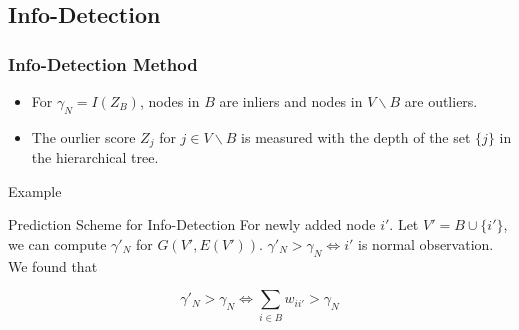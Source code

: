 \documentclass[notheorems]{beamer}
\begin{document}
\subsection{Info-Detection}
\begin{frame}
	\frametitle{Info-Detection Method}
\begin{itemize}
\item For $\gamma_N = I(Z_B)$, nodes in $B$ are inliers and nodes in $V\backslash B$ are outliers.
\item The ourlier score $Z_j$ for $j \in V\backslash B$ is measured with the depth of the set $\{j\}$ in the hierarchical tree.
\end{itemize}
Example
\end{frame}
\begin{frame}{Prediction Scheme for Info-Detection}
For newly added node $i'$. Let $V'=B\cup \{i'\}$, we can compute $\gamma'_N$ for $G(V', E(V'))$.
$ \gamma'_N > \gamma_N \iff i'$ is normal observation. We found that
\begin{proposition}
\begin{equation}
\gamma'_N > \gamma_N \iff  \sum_{i \in B} w_{ii'} > \gamma_N 
\end{equation}
\end{proposition}
\end{frame}
\end{document}
